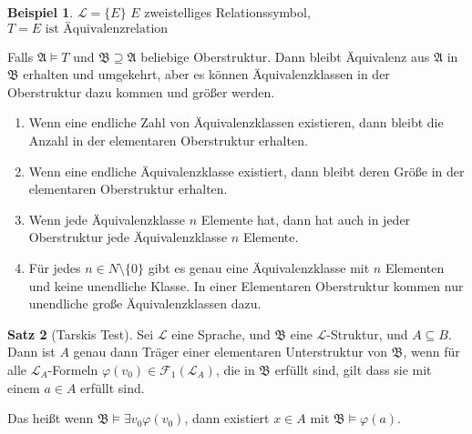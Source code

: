\documentclass[12pt,parskip=full]{scrartcl}
\theoremstyle{definition}
\newtheorem{theorem}{Satz}[section]
\newtheorem{example}[theorem]{Beispiel}
\begin{document}
	\begin{example}
		$\mathcal{L} = \{ E \}$ $E$ zweistelliges Relationssymbol, $T = \text{$E$ ist Äquivalenzrelation}$
		
		Falls $\mathfrak{A} \models T$ und $\mathfrak{B} \supseteq \mathfrak{A}$ beliebige Oberstruktur. Dann bleibt Äquivalenz aus $\mathfrak{A}$ in $\mathfrak{B}$ erhalten und umgekehrt, aber es können Äquivalenzklassen in der Oberstruktur dazu kommen und größer werden.
		
		\begin{enumerate}
			\item Wenn eine endliche Zahl von Äquivalenzklassen existieren, dann bleibt die Anzahl in der elementaren Oberstruktur erhalten.
			\item Wenn eine endliche Äquivalenzklasse existiert, dann bleibt deren Größe in der elementaren Oberstruktur erhalten.
			\item Wenn jede Äquivalenzklasse $n$ Elemente hat, dann hat auch in jeder Oberstruktur jede Äquivalenzklasse $n$ Elemente.
			\item Für jedes $n \in N \setminus \{ 0 \}$ gibt es genau eine Äquivalenzklasse mit $n$ Elementen und keine unendliche Klasse. In einer Elementaren Oberstruktur kommen nur unendliche große Äquivalenzklassen dazu.
		\end{enumerate}
	\end{example}

	\begin{theorem}[Tarskis Test]
		Sei $\mathcal{L}$ eine Sprache, und $\mathfrak{B}$ eine $\mathcal{L}$-Struktur, und $A \subseteq B$. Dann ist $A$ genau dann Träger einer elementaren Unterstruktur von $\mathfrak{B}$, wenn für alle $\mathcal{L}_A$-Formeln $\varphi(v_0) \in \mathcal{F}_1(\mathcal{L}_A)$, die in $\mathfrak{B}$ erfüllt sind, gilt dass sie mit einem $a \in A$ erfüllt sind.
		
		Das heißt wenn $\mathfrak{B} \models \exists v_0 \varphi(v_0)$, dann existiert $x \in A$ mit $\mathfrak{B} \models \varphi(a)$.
	\end{theorem}
\end{document}
